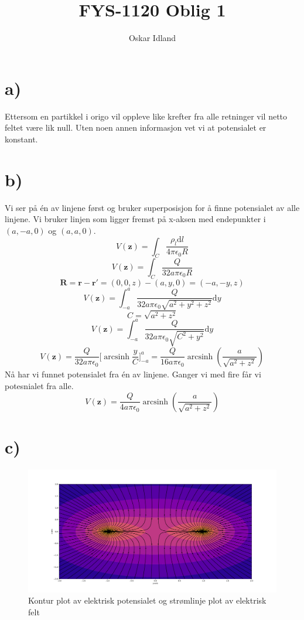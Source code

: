 \documentclass{article}
\author{Oskar Idland}
\title{FYS-1120 Oblig 1}
\date{}
\begin{document}
\maketitle
\newpage

\section*{a)}
  Ettersom en partikkel i origo vil oppleve like krefter fra alle retninger vil netto feltet være lik null. 
  Uten noen annen informasjon vet vi at potensialet er konstant. 

\section*{b)}
  Vi ser på én av linjene først og bruker superposisjon for å finne potensialet av alle linjene. Vi bruker linjen som ligger fremst på x-aksen med endepunkter i $ (a,-a,0) $ og $ (a,a,0) $. 
  \[
  V(\mathbf{z}) = ∫ _C \frac{\rho _l \mathrm{d}l}{4 \pi ϵ_0 R}
  \]
  \[
  V(\mathbf{z}) = ∫ _C \frac{Q}{32 a\pi ϵ_{0}R}
  \]
  \[
  \mathbf{R} = \mathbf{r} - \mathbf{r}' = (0,0,z) - (a,y,0) = (-a,-y,z)
  \]
  \[
  V(\mathbf{z}) = ∫ _{-a} ^{a} \frac{Q}{32 a π ϵ_{0} \sqrt{a^{2} + y^{2} + z^{2}} } \mathrm{d}y
  \]
  \[
  C = \sqrt{a^2 + z^2} 
  \]
  \[
  V(\mathbf{z}) = ∫ _{-a} ^{a} \frac{Q}{32a \pi ϵ_{0} \sqrt{C^{2} + y^{2}} } \mathrm{d}y
  \]
  \[
  V(\mathbf{z}) = \frac{Q}{32a \pi ϵ_0} \bigg[ \operatorname{arcsinh} \frac{y}{C} \bigg]_{-a}^{a} = \frac{Q}{16 a \pi ϵ_0} \operatorname{arcsinh} \left(\frac{a}{\sqrt{a^2 + z^2}}\right)_{}^{}
  \]
  Nå har vi funnet potensialet fra én av linjene. Ganger vi med fire får vi potesnialet fra alle. 
  \begin{equation} \label{Electric Potential 4lines }
    V(\mathbf{z}) = \frac{Q}{4a \pi ϵ_0} \operatorname{arcsinh} \left( \frac{a}{\sqrt{a^{2} + z^{2}}} \right) 
  \end{equation}
\newpage
\section*{c)}
  \begin{figure}[h!]
    \centering
    \includegraphics[scale = .3]{Potential_And_Field.pdf}
    \caption{Kontur plot av elektrisk potensialet og strømlinje plot av elektrisk felt}
    \label{fig:figure1}
  \end{figure}  
\end{document}
